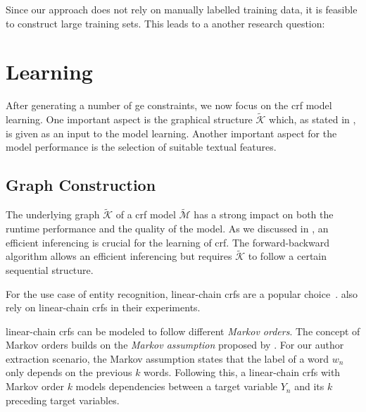 \bigskip

Since our approach does not rely on manually labelled training data, it is feasible to construct large training sets.
This leads to a another research question:
\newcommand\researchquestionsix{}
\researchquestionsix%




\section{Learning }\label{sec:ae-learning-crfs}

After generating a number of \gls{ge} constraints, we now focus on the \gls{crf} model learning.
One important aspect is the graphical structure $\mathcal{\tilde{K}}$ which, as stated in , is given as an input to the model learning.
Another important aspect for the model performance is the selection of suitable textual features.

\subsection{Graph Construction}\label{subsec:ae-graph-construction}

The underlying graph $\mathcal{\tilde{K}}$ of a \gls{crf} model $\mathcal{\tilde{M}}$ has a strong impact on both the runtime performance and the quality of the model.
As we discussed in , an efficient inferencing is crucial for the learning of \gls{crf}.
The \gls{forward-backward algorithm} allows an efficient inferencing but requires $\mathcal{\tilde{K}}$ to follow a certain sequential structure.

For the use case of entity recognition, \glspl{linear-chain crf} are a popular choice~\citep[e.g.][]{peng2004accurate,mann2008generalized,ling2012fine,groza2012reference,ohta2014empirical}.
\citet{lu2013web} also rely on \glspl{linear-chain crf} in their experiments.

\Glspl{linear-chain crf} can be modeled to follow different \textit{Markov orders}.
The concept of Markov orders builds on the \textit{Markov assumption} proposed by \citet{markov1957theory}.
For our author extraction scenario, the Markov assumption states that the label of a word $w_n$ only depends on the previous $k$ words.
Following this, a \glspl{linear-chain crf} with Markov order $k$ models dependencies between a \gls{target variable} $Y_n$ and its $k$ preceding \glspl{target variable}.

